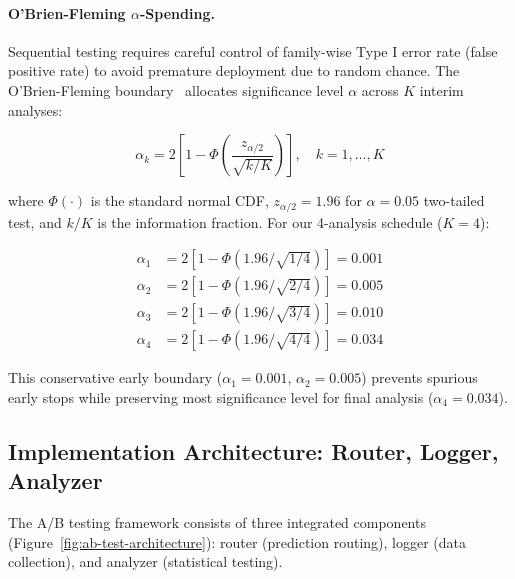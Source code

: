 \paragraph{O'Brien-Fleming $\alpha$-Spending.}
Sequential testing requires careful control of family-wise Type I error rate (false positive rate) to avoid premature deployment due to random chance. The O'Brien-Fleming boundary~\citep{obrien1979multiple} allocates significance level $\alpha$ across $K$ interim analyses:

\begin{equation}
\alpha_k = 2 \left[ 1 - \Phi \left( \frac{z_{\alpha/2}}{\sqrt{k/K}} \right) \right], \quad k = 1, \ldots, K
\label{eq:obf-alpha-spending}
\end{equation}

where $\Phi(\cdot)$ is the standard normal CDF, $z_{\alpha/2} = 1.96$ for $\alpha = 0.05$ two-tailed test, and $k/K$ is the information fraction. For our 4-analysis schedule ($K = 4$):

\begin{align*}
\alpha_1 &= 2[1 - \Phi(1.96 / \sqrt{1/4})] = 0.001 \\
\alpha_2 &= 2[1 - \Phi(1.96 / \sqrt{2/4})] = 0.005 \\
\alpha_3 &= 2[1 - \Phi(1.96 / \sqrt{3/4})] = 0.010 \\
\alpha_4 &= 2[1 - \Phi(1.96 / \sqrt{4/4})] = 0.034
\end{align*}

This conservative early boundary ($\alpha_1 = 0.001$, $\alpha_2 = 0.005$) prevents spurious early stops while preserving most significance level for final analysis ($\alpha_4 = 0.034$).

\subsection{Implementation Architecture: Router, Logger, Analyzer}

The A/B testing framework consists of three integrated components (Figure~\ref{fig:ab-test-architecture}): router (prediction routing), logger (data collection), and analyzer (statistical testing).

